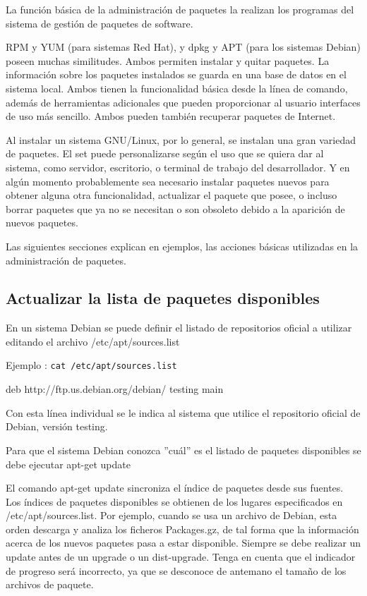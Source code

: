 \documentclass[12pt]{article}
\begin{document}
La función básica de la administración de paquetes la realizan los programas del sistema
de gestión de paquetes de software. 

RPM y YUM (para sistemas Red Hat), y dpkg y APT (para los sistemas Debian) poseen muchas similitudes. 
Ambos permiten instalar y quitar paquetes. La información sobre los paquetes instalados se guarda en una base de datos en el sistema local. Ambos tienen la funcionalidad básica desde la línea de comando, además de herramientas adicionales que pueden proporcionar al usuario interfaces de uso más sencillo. Ambos pueden también recuperar paquetes de Internet.

Al instalar un sistema GNU/Linux, por lo general, se instalan una gran variedad de paquetes. 
El set puede personalizarse según el uso que se quiera dar al sistema, como servidor, escritorio, o terminal de trabajo del desarrollador. 
Y en algún momento probablemente sea necesario instalar paquetes nuevos para obtener alguna otra funcionalidad, actualizar el paquete que posee, o incluso borrar paquetes que ya no se necesitan o son obsoleto debido a la aparición de nuevos paquetes. 

Las siguientes secciones explican en ejemplos, las acciones básicas utilizadas en la administración
de paquetes.

\subsection*{Actualizar la lista de paquetes disponibles}

En un sistema Debian se puede definir el listado de repositorios oficial a utilizar  editando el archivo /etc/apt/sources.list

Ejemplo :
{\tt cat /etc/apt/sources.list}

deb http://ftp.us.debian.org/debian/ testing main

Con esta línea individual se le indica al sistema que utilice el repositorio oficial de Debian, versión testing.

Para que el sistema Debian conozca ''cuál'' es el listado de paquetes disponibles se debe ejecutar apt-get update

El comando apt-get update sincroniza el índice de paquetes desde sus
           fuentes. Los índices de paquetes disponibles se obtienen de los
           lugares especificados en /etc/apt/sources.list. Por ejemplo, cuando
           se usa un archivo de Debian, esta orden descarga y analiza los
           ficheros Packages.gz, de tal forma que la información acerca de los
           nuevos paquetes pasa a estar disponible. Siempre se debe realizar
           un update antes de un upgrade o un dist-upgrade. Tenga en cuenta
           que el indicador de progreso será incorrecto, ya que se desconoce
           de antemano el tamaño de los archivos de paquete.
\end{document}
